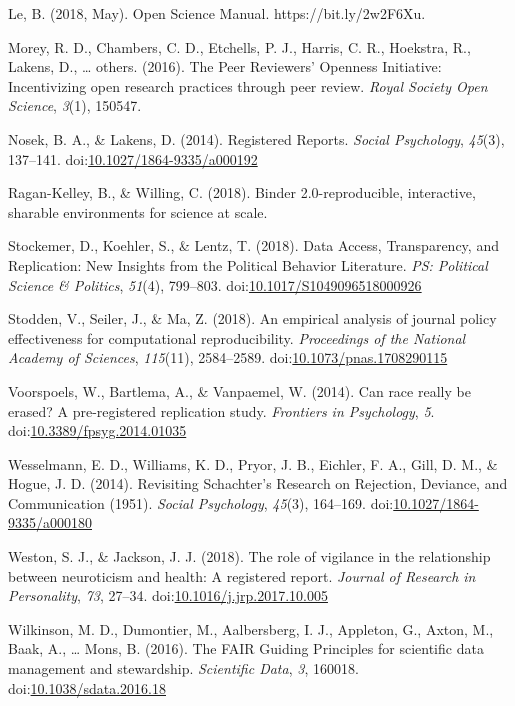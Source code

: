 \documentclass[,jou, a4paper,floatsintext]{apa6}
\begin{document}
\leavevmode\hypertarget{ref-le_open_2018}{}%
Le, B. (2018, May). Open Science Manual. https://bit.ly/2w2F6Xu.

\leavevmode\hypertarget{ref-morey_peer_2016}{}%
Morey, R. D., Chambers, C. D., Etchells, P. J., Harris, C. R., Hoekstra, R., Lakens, D., \ldots{} others. (2016). The Peer Reviewers' Openness Initiative: Incentivizing open research practices through peer review. \emph{Royal Society Open Science}, \emph{3}(1), 150547.

\leavevmode\hypertarget{ref-nosek_registered_2014}{}%
Nosek, B. A., \& Lakens, D. (2014). Registered Reports. \emph{Social Psychology}, \emph{45}(3), 137--141. doi:\href{https://doi.org/10.1027/1864-9335/a000192}{10.1027/1864-9335/a000192}

\leavevmode\hypertarget{ref-ragan2018binder}{}%
Ragan-Kelley, B., \& Willing, C. (2018). Binder 2.0-reproducible, interactive, sharable environments for science at scale.

\leavevmode\hypertarget{ref-stockemer_data_2018}{}%
Stockemer, D., Koehler, S., \& Lentz, T. (2018). Data Access, Transparency, and Replication: New Insights from the Political Behavior Literature. \emph{PS: Political Science \& Politics}, \emph{51}(4), 799--803. doi:\href{https://doi.org/10.1017/S1049096518000926}{10.1017/S1049096518000926}

\leavevmode\hypertarget{ref-stodden_empirical_2018}{}%
Stodden, V., Seiler, J., \& Ma, Z. (2018). An empirical analysis of journal policy effectiveness for computational reproducibility. \emph{Proceedings of the National Academy of Sciences}, \emph{115}(11), 2584--2589. doi:\href{https://doi.org/10.1073/pnas.1708290115}{10.1073/pnas.1708290115}

\leavevmode\hypertarget{ref-voorspoels_can_2014}{}%
Voorspoels, W., Bartlema, A., \& Vanpaemel, W. (2014). Can race really be erased? A pre-registered replication study. \emph{Frontiers in Psychology}, \emph{5}. doi:\href{https://doi.org/10.3389/fpsyg.2014.01035}{10.3389/fpsyg.2014.01035}

\leavevmode\hypertarget{ref-wesselmann_revisiting_2014}{}%
Wesselmann, E. D., Williams, K. D., Pryor, J. B., Eichler, F. A., Gill, D. M., \& Hogue, J. D. (2014). Revisiting Schachter's Research on Rejection, Deviance, and Communication (1951). \emph{Social Psychology}, \emph{45}(3), 164--169. doi:\href{https://doi.org/10.1027/1864-9335/a000180}{10.1027/1864-9335/a000180}

\leavevmode\hypertarget{ref-weston_role_2018}{}%
Weston, S. J., \& Jackson, J. J. (2018). The role of vigilance in the relationship between neuroticism and health: A registered report. \emph{Journal of Research in Personality}, \emph{73}, 27--34. doi:\href{https://doi.org/10.1016/j.jrp.2017.10.005}{10.1016/j.jrp.2017.10.005}

\leavevmode\hypertarget{ref-wilkinson_fair_2016}{}%
Wilkinson, M. D., Dumontier, M., Aalbersberg, I. J., Appleton, G., Axton, M., Baak, A., \ldots{} Mons, B. (2016). The FAIR Guiding Principles for scientific data management and stewardship. \emph{Scientific Data}, \emph{3}, 160018. doi:\href{https://doi.org/10.1038/sdata.2016.18}{10.1038/sdata.2016.18}
\end{document}
